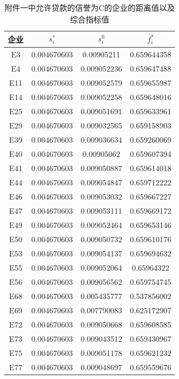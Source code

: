\documentclass{cumcmthesis}
\begin{document}
\begin{appendices}
\begin{table}[H]   %
	\caption{附件一中允许贷款的信誉为C的企业的距离值以及综合指标值}\label{tab:012} \centering
	\begin{tabular}{cccc}
		\toprule[1.5pt]
		企业 & $s_i^*$    & $s_i^0$        & $f_i^*$         \\
		\midrule[1pt]
E3 & 0.004670603 & 0.00905211 & 0.659644358 \\ 
E4 & 0.004670603 & 0.009052236 & 0.659647488 \\ 
E11 & 0.004670603 & 0.009052579 & 0.659655987 \\ 
E14 & 0.004670603 & 0.009052258 & 0.659648016 \\ 
E25 & 0.004670603 & 0.009051691 & 0.659633961 \\ 
E29 & 0.004670603 & 0.009032565 & 0.659158903 \\ 
E39 & 0.004670603 & 0.009036634 & 0.659260069 \\ 
E40 & 0.004670603 & 0.00905062 & 0.659607394 \\ 
E41 & 0.004670603 & 0.009050887 & 0.659614018 \\ 
E44 & 0.004670603 & 0.009054847 & 0.659712222 \\ 
E46 & 0.004670603 & 0.009053032 & 0.659667227 \\ 
E47 & 0.004670603 & 0.009053111 & 0.659669172 \\ 
E49 & 0.004670603 & 0.009052464 & 0.659653146 \\ 
E50 & 0.004670603 & 0.009050732 & 0.659610176 \\ 
E53 & 0.004670603 & 0.009054137 & 0.659694632 \\ 
E55 & 0.004670603 & 0.009052064 & 0.65964322 \\ 
E56 & 0.004670603 & 0.009056562 & 0.659754745 \\ 
E68 & 0.004670603 & 0.005435777 & 0.537856002 \\ 
E69 & 0.004670603 & 0.007790083 & 0.625172907 \\ 
E72 & 0.004670603 & 0.009050668 & 0.659608585 \\ 
E73 & 0.004670603 & 0.009043512 & 0.659430967 \\ 
E75 & 0.004670603 & 0.009051178 & 0.659621232 \\ 
E77 & 0.004670603 & 0.009048697 & 0.659559676 \\ 
		\bottomrule[1.5pt]
\end{tabular}
\end{table}


\end{appendices}
\end{document}

